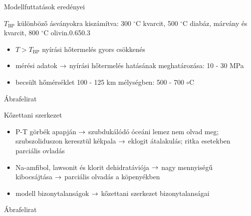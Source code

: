 \begin{frame}{Modellfuttatások eredényei}
    \begin{figp}{}{$T_{\text{BP}}$ különböző ásványokra kiszámítva: 300 $^\circ$C kvarcit, 500 $^\circ$C diabáz, márvány és kvarcit, 800 $^\circ$C olivin.}{0.65}{0.3}
        \begin{itemize}
            \item $ T > T_{\text{BP}}$ nyírási hőtermelés gyors csökkenés
            \item mérési adatok $\rightarrow$ nyírási hőtermelés hatásának meghatározása: 10 - 30 MPa
            \item becsült hőmérséklet 100 - 125 km mélységben: 500 - 700 $\circ$C
        \end{itemize}
    \end{figp}
\end{frame}


\begin{frame}{Ábrafelirat}
    \begin{minic}{0.95}
    \end{minic}
\end{frame}


\begin{frame}{Kőzettani szerkezet}
    \begin{minipage}[c]{0.45\textwidth}
        \centering
    \end{minipage}
    \hspace{5pt}
    \begin{minipage}[c]{0.45\textwidth}
        \begin{itemize}
            \item P-T görbék apapján $\rightarrow$ szubdukálódó óceáni lemez nem olvad meg; szubszoliduszon keresztül kékpala $\rightarrow$ eklogit átalakulás; ritka esetekben parciális ovladás
            \item Na-amfibol, lawsonit és klorit dehidratáviója $\rightarrow$ nagy mennyiségű  kibocsájtása $\rightarrow$ parciális olvadás a köpenyékben
            \item modell bizonytalanságok $\rightarrow$ kőzettani szerkezet bizonytalanságai
        \end{itemize}
    \end{minipage}
\end{frame}


\begin{frame}{Ábrafelirat}
    \begin{minic}{0.8}
    \end{minic}
\end{frame}
